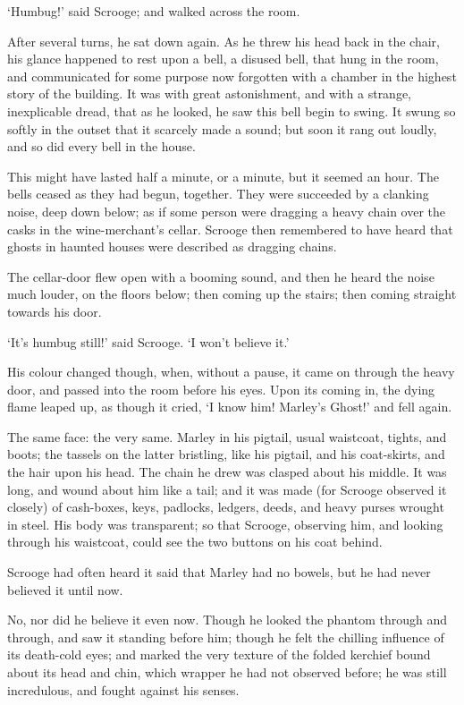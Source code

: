 \documentclass[11pt,twoside]{article}\makeatletter
\begin{document}
‘Humbug!’ said Scrooge; and walked across the room.  \par
After several turns, he sat down again.  As he threw his head back in the chair, his glance happened to rest upon a bell, a disused bell, that hung in the room, and communicated for some purpose now forgotten with a chamber in the highest story of the building.  It was with great astonishment, and with a strange, inexplicable dread, that as he looked, he saw this bell begin to swing.  It swung so softly in the outset that it scarcely made a sound; but soon it rang out loudly, and so did every bell in the house.  \par
This might have lasted half a minute, or a minute, but it seemed an hour.  The bells ceased as they had begun, together.  They were succeeded by a clanking noise, deep down below; as if some person were dragging a heavy chain over the casks in the wine-merchant's cellar.  Scrooge then remembered to have heard that ghosts in haunted houses were described as dragging chains.  \par
The cellar-door flew open with a booming sound, and then he heard the noise much louder, on the floors below; then coming up the stairs; then coming straight towards his door.  \par
‘It's humbug still!’ said Scrooge.  ‘I won't believe it.’\par
His colour changed though, when, without a pause, it came on through the heavy door, and passed into the room before his eyes.  Upon its coming in, the dying flame leaped up, as though it cried, ‘I know him! Marley's Ghost!’ and fell again.  \par
The same face: the very same.  Marley in his pigtail, usual waistcoat, tights, and boots; the tassels on the latter bristling, like his pigtail, and his coat-skirts, and the hair upon his head.  The chain he drew was clasped about his middle.  It was long, and wound about him like a tail; and it was made (for Scrooge observed it closely) of cash-boxes, keys, padlocks, ledgers, deeds, and heavy purses wrought in steel.  His body was transparent; so that Scrooge, observing him, and looking through his waistcoat, could see the two buttons on his coat behind. \par
Scrooge had often heard it said that Marley had no bowels, but he had never believed it until now.  \par
No, nor did he believe it even now.  Though he looked the phantom through and through, and saw it standing before him; though he felt the chilling influence of its death-cold eyes; and marked the very texture of the folded kerchief bound about its head and chin, which wrapper he had not observed before; he was still incredulous, and fought against his senses.  \par
\end{document}
